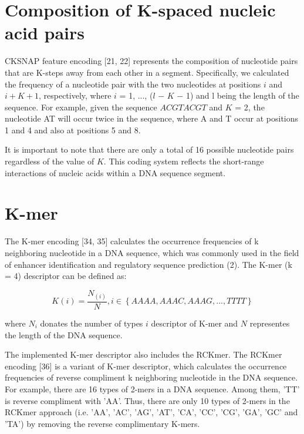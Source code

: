 \section{Composition of K-spaced nucleic acid pairs}

\gls{CKSNAP} feature encoding [21, 22] represents the composition of nucleotide pairs that are K-steps away from each other in a segment. Specifically, we calculated the frequency of a nucleotide pair with the two nucleotides at positions $i$ and $i + K + 1$, respectively, where $i$ = 1, ..., ($l$ − $K$ − 1) and l being the length of the sequence. For example, given the sequence $ACGTACGT$ and $K$ = 2, the nucleotide AT will occur twice in the sequence, where A and T occur at positions 1 and 4 and also at positions 5 and 8. 

It is important to note that there are only a total of 16 possible nucleotide pairs regardless of the value of $K$. This coding system reflects the short-range interactions of nucleic acids within a \gls{DNA} sequence segment.

\section{K-mer}

The K-mer encoding [34, 35] calculates the occurrence frequencies of k neighboring nucleotide in a \gls{DNA} sequence, which was commonly used in the field of enhancer identification and regulatory sequence prediction (2). The K-mer (k = 4) descriptor can be defined as:

\begin{equation}\label{eq:K-mer}
    K(i) = \frac{N_{(i)}}{N}, i \in \left\{AAAA, AAAC, AAAG,...,TTTT\right\}
\end{equation}

where $N_{i}$ donates the number of types $i$ descriptor of K-mer and $N$ representes the length of the DNA sequence.

The implemented K-mer descriptor also includes the \gls{RCKmer}. The \gls{RCKmer} encoding [36] is a variant of K-mer descriptor, which calculates the occurrence frequencies of reverse compliment k neighboring nucleotide in the \gls{DNA} sequence. For example, there are 16 types of 2-mers in a \gls{DNA} sequence. Among them, 'TT' is reverse compliment with 'AA'. Thus, there are only 10 types of 2-mers in the \gls{RCKmer} approach (i.e. 'AA', 'AC', 'AG', 'AT', 'CA', 'CC', 'CG', 'GA', 'GC' and 'TA') by removing the reverse complimentary K-mers.


